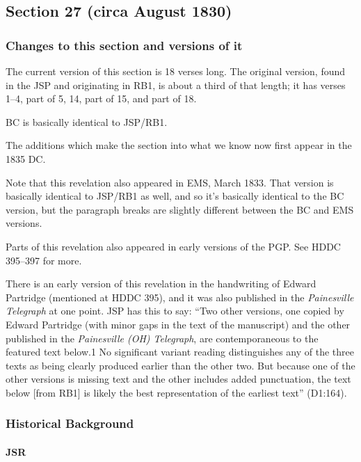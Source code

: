 \subsection{Section 27 (circa August 1830)}
	\label{DC27}
	
	\subsubsection{Changes to this section and versions of it}
	
		The current version of this section is 18 verses long. The original version, found in the JSP and originating in RB1, is about a third of that length; it has verses 1--4, part of 5, 14, part of 15, and part of 18. 
		
		BC is basically identical to JSP/RB1.
		
		The additions which make the section into what we know now first appear in the 1835 DC.
		
		Note that this revelation also appeared in EMS, March 1833. That version is basically identical to JSP/RB1 as well, and so it's basically identical to the BC version, but the paragraph breaks are slightly different between the BC and EMS versions.
		
		Parts of this revelation also appeared in early versions of the PGP. See HDDC 395--397 for more.
		
		There is an early version of this revelation in the handwriting of Edward Partridge (mentioned at HDDC 395), and it was also published in the \textit{Painesville Telegraph} at one point. JSP has this to say: ``Two other versions, one copied by Edward Partridge (with minor gaps in the text of the manuscript) and the other published in the \textit{Painesville (OH) Telegraph}, are contemporaneous to the featured text below.1 No significant variant reading distinguishes any of the three texts as being clearly produced earlier than the other two. But because one of the other versions is missing text and the other includes added punctuation, the text below [from RB1] is likely the best representation of the earliest text'' (D1:164).
	
	\subsubsection{Historical Background}
		\label{DC27-HB}
		
		\paragraph{JSR}
		
